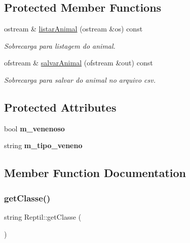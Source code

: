 \subsection*{Protected Member Functions}
\begin{DoxyCompactItemize}
\item 
\mbox{\label{class_reptil_a9e64ef8d8067e1c21bcadd23bb033e66}} 
ostream \& \mbox{\hyperlink{class_reptil_a9e64ef8d8067e1c21bcadd23bb033e66}{listar\+Animal}} (ostream \&os) const
\begin{DoxyCompactList}\small\item\em Sobrecarga para listagem do animal. \end{DoxyCompactList}\item 
\mbox{\label{class_reptil_afce418fef9878321a6b2e2166bec6ca8}} 
ofstream \& \mbox{\hyperlink{class_reptil_afce418fef9878321a6b2e2166bec6ca8}{salvar\+Animal}} (ofstream \&out) const
\begin{DoxyCompactList}\small\item\em Sobrecarga para salvar do animal no arquivo csv. \end{DoxyCompactList}\end{DoxyCompactItemize}
\subsection*{Protected Attributes}
\begin{DoxyCompactItemize}
\item 
\mbox{\label{class_reptil_ac195c1dc9a0fa38bc0551034c609c434}} 
bool {\bfseries m\+\_\+venenoso}
\item 
\mbox{\label{class_reptil_a6be652c80a0837adc98c0992572272a2}} 
string {\bfseries m\+\_\+tipo\+\_\+veneno}
\end{DoxyCompactItemize}


\subsection{Member Function Documentation}
\mbox{\label{class_reptil_a9f247a06f325343bf147b5b93d3237fb}} 
\subsubsection{\texorpdfstring{getClasse()}{getClasse()}}
{\footnotesize\ttfamily string Reptil\+::get\+Classe (\begin{DoxyParamCaption}{ }\end{DoxyParamCaption})\hspace{0.3cm}{\ttfamily [virtual]}}



